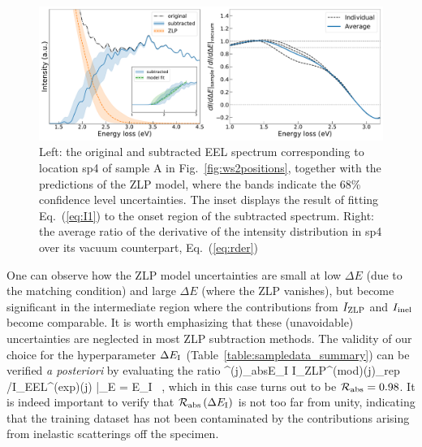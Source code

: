 \begin{figure}[t]
\begin{centering}
  \includegraphics[width=0.99\linewidth]{plots/SubtractedEELS_plot_sp14.pdf}
   \caption{Left: the original
     and subtracted EEL spectrum corresponding to location sp4 of sample A in Fig.~\ref{fig:ws2positions},
     together with the predictions of the ZLP model, where
     the bands indicate the 68\% confidence level uncertainties.
     The inset displays the result of fitting Eq.~(\ref{eq:I1}) to the onset
     region of the subtracted spectrum.
     Right: the average ratio of the derivative of the intensity
     distribution in sp4 over its vacuum counterpart, Eq.~(\ref{eq:rder})
  }
\label{fig:sp14_subtracted_spectrum}
\end{centering}
\end{figure}

One can observe how the ZLP model uncertainties are small at low $\Delta E$
(due to the matching condition) and large $\Delta E$ (where the ZLP vanishes),
but become significant in the intermediate region where the contributions
from $I_{\rm ZLP}$ and $I_{\rm inel}$ become comparable.
%
It is worth emphasizing that these (unavoidable) uncertainties are neglected in most
ZLP subtraction methods.
%
The validity of our choice for the hyperparameter $\Delta E_{\rm I}$ (Table~\ref{table:sampledata_summary})
can be verified {\it a posteriori} by evaluating the ratio
\be
{}^{(j)}_{\rm abs}\lp \Delta E_{\rm I}\rp \equiv 
\la I_{\rm ZLP}^{({\rm mod})(j)}\ra_{\rm rep} \Big/I_{\rm EEL}^{({\rm exp})(j)} \Big|_{\Delta E = \Delta E_{\rm I}} \, ,
\ee
which in this case turns out to be $\mathcal{R}_{\rm abs} = 0.98$.
%
It is indeed important to verify that $\mathcal{R}_{\rm abs}\left( \Delta E_{\rm I}\right)$ is not too far from unity,
indicating that the training dataset has not been contaminated by the  contributions
arising from inelastic scatterings off the specimen.

